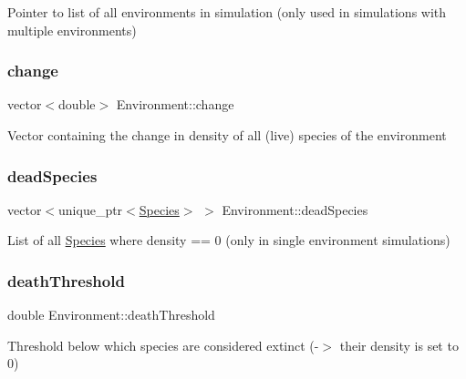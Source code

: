 Pointer to list of all environments in simulation (only used in simulations with multiple environments) \hypertarget{classEnvironment_a4dac7620968f061a62c2b51f4a29e402}{}\label{classEnvironment_a4dac7620968f061a62c2b51f4a29e402} 
\subsubsection{\texorpdfstring{change}{change}}
{\footnotesize\ttfamily vector$<$double$>$ Environment\+::change\hspace{0.3cm}{\ttfamily [protected]}}

Vector containing the change in density of all (live) species of the environment \hypertarget{classEnvironment_a5ff095d15af0aaf954a0ad9afe5d8a01}{}\label{classEnvironment_a5ff095d15af0aaf954a0ad9afe5d8a01} 
\subsubsection{\texorpdfstring{dead\+Species}{deadSpecies}}
{\footnotesize\ttfamily vector$<$unique\+\_\+ptr$<$\hyperlink{classSpecies}{Species}$>$ $>$ Environment\+::dead\+Species\hspace{0.3cm}{\ttfamily [protected]}}

List of all \hyperlink{classSpecies}{Species} where {\ttfamily density == 0} (only in single environment simulations) \hypertarget{classEnvironment_a79a718ed66d6e70b38763150b4245064}{}\label{classEnvironment_a79a718ed66d6e70b38763150b4245064} 
\subsubsection{\texorpdfstring{death\+Threshold}{deathThreshold}}
{\footnotesize\ttfamily double Environment\+::death\+Threshold\hspace{0.3cm}{\ttfamily [protected]}}

Threshold below which species are considered extinct (-\/$>$ their density is set to 0) \hypertarget{classEnvironment_ab21bc1c8553a1649b306dc80f7db558b}{}\label{classEnvironment_ab21bc1c8553a1649b306dc80f7db558b} 
